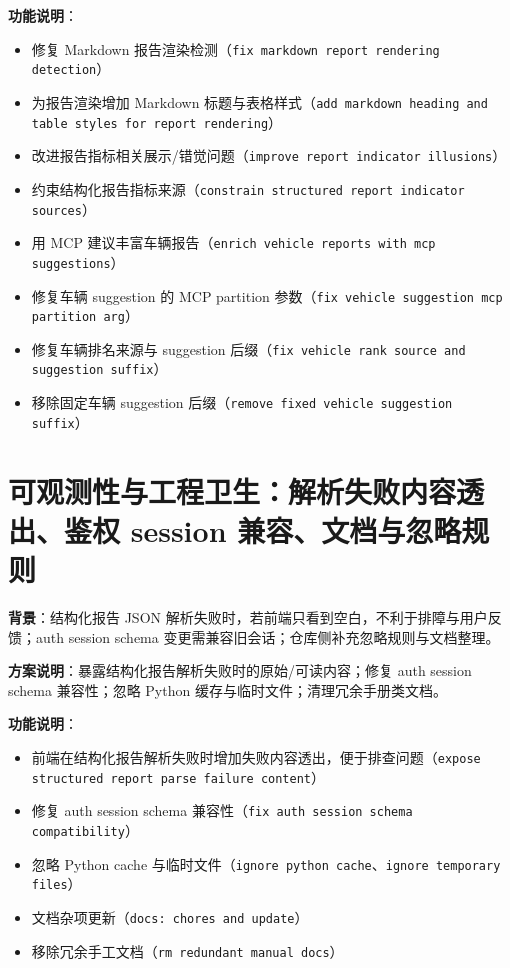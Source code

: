 \documentclass[UTF8]{ctexart}
\begin{document}
\textbf{功能说明}：
\begin{itemize}
\item 修复 Markdown 报告渲染检测（\texttt{fix markdown report rendering detection}）
\item 为报告渲染增加 Markdown 标题与表格样式（\texttt{add markdown heading and table styles for report rendering}）
\item 改进报告指标相关展示/错觉问题（\texttt{improve report indicator illusions}）
\item 约束结构化报告指标来源（\texttt{constrain structured report indicator sources}）
\item 用 MCP 建议丰富车辆报告（\texttt{enrich vehicle reports with mcp suggestions}）
\item 修复车辆 suggestion 的 MCP partition 参数（\texttt{fix vehicle suggestion mcp partition arg}）
\item 修复车辆排名来源与 suggestion 后缀（\texttt{fix vehicle rank source and suggestion suffix}）
\item 移除固定车辆 suggestion 后缀（\texttt{remove fixed vehicle suggestion suffix}）
\end{itemize}

\section{可观测性与工程卫生：解析失败内容透出、鉴权 session 兼容、文档与忽略规则}

\textbf{背景}：结构化报告 JSON 解析失败时，若前端只看到空白，不利于排障与用户反馈；auth session schema 变更需兼容旧会话；仓库侧补充忽略规则与文档整理。

\textbf{方案说明}：暴露结构化报告解析失败时的原始/可读内容；修复 auth session schema 兼容性；忽略 Python 缓存与临时文件；清理冗余手册类文档。

\textbf{功能说明}：
\begin{itemize}
\item 前端在结构化报告解析失败时增加失败内容透出，便于排查问题（\texttt{expose structured report parse failure content}）
\item 修复 auth session schema 兼容性（\texttt{fix auth session schema compatibility}）
\item 忽略 Python cache 与临时文件（\texttt{ignore python cache}、\texttt{ignore temporary files}）
\item 文档杂项更新（\texttt{docs: chores and update}）
\item 移除冗余手工文档（\texttt{rm redundant manual docs}）
\end{itemize}
\end{document}
